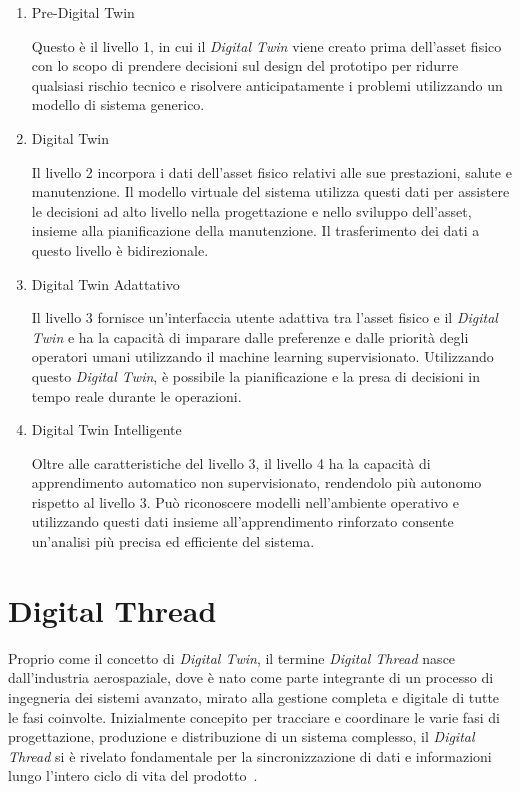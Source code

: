 \begin{enumerate}
    \item Pre-Digital Twin
    
    Questo è il livello 1, in cui il \emph{Digital Twin} viene creato prima dell'asset fisico con lo scopo di prendere decisioni sul design del prototipo per ridurre qualsiasi rischio tecnico e risolvere anticipatamente i problemi utilizzando un modello di sistema generico.

    \item Digital Twin
    
    Il livello 2 incorpora i dati dell'asset fisico relativi alle sue prestazioni, salute e manutenzione. Il modello virtuale del sistema utilizza questi dati per assistere le decisioni ad alto livello nella progettazione e nello sviluppo dell'asset, insieme alla pianificazione della manutenzione. Il trasferimento dei dati a questo livello è bidirezionale.

    \item Digital Twin Adattativo
    
    Il livello 3 fornisce un'interfaccia utente adattiva tra l'asset fisico e il \emph{Digital Twin} e ha la capacità di imparare dalle preferenze e dalle priorità degli operatori umani utilizzando il machine learning supervisionato. Utilizzando questo \emph{Digital Twin}, è possibile la pianificazione e la presa di decisioni in tempo reale durante le operazioni.
    
    \item Digital Twin Intelligente
    
    Oltre alle caratteristiche del livello 3, il livello 4 ha la capacità di apprendimento automatico non supervisionato, rendendolo più autonomo rispetto al livello 3. Può riconoscere modelli nell'ambiente operativo e utilizzando questi dati insieme all'apprendimento rinforzato consente un'analisi più precisa ed efficiente del sistema.
    
\end{enumerate}

\section{Digital Thread}
Proprio come il concetto di \emph{Digital Twin}, il termine \emph{Digital Thread} nasce dall'industria aerospaziale, dove è nato come parte integrante di un processo di ingegneria dei sistemi avanzato, mirato alla gestione completa e digitale di tutte le fasi coinvolte. Inizialmente concepito per tracciare e coordinare le varie fasi di progettazione, produzione e distribuzione di un sistema complesso, il \emph{Digital Thread} si è rivelato fondamentale per la sincronizzazione di dati e informazioni lungo l'intero ciclo di vita del prodotto~\cite{Thread}.

